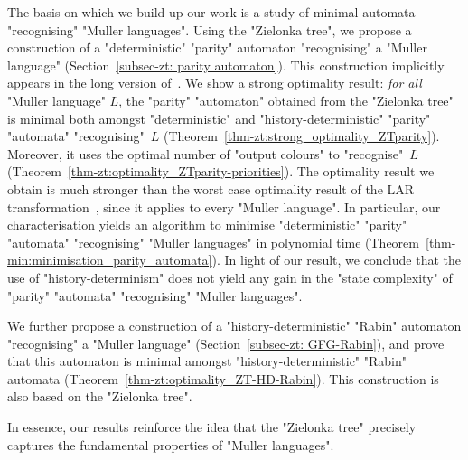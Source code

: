 \documentclass[10pt,a4paper]{amsart}
\newenvironment{longdescription} %
{\begin{description}[style=unboxed]}
	{\end{description}}
\begin{document}
\begin{longdescription}
	\item[1. Minimal automata for Muller languages.] The basis on which we build up our work is a study of minimal automata "recognising" "Muller languages". Using the "Zielonka tree", we propose a construction of a "deterministic" "parity" automaton "recognising" a "Muller language" (Section~\ref{subsec-zt: parity automaton}). This construction implicitly appears in the long version of~\cite{DJW1997memory}. We show a strong optimality result: \emph{for all} "Muller language" $L$, the "parity" "automaton" obtained from the "Zielonka tree" is minimal both amongst "deterministic" and "history-deterministic" "parity" "automata" "recognising"~$L$ (Theorem~\ref{thm-zt:strong_optimality_ZTparity}).\footnotemark{} Moreover, it uses the optimal number of "output colours" to "recognise"~$L$ (Theorem~\ref{thm-zt:optimality_ZTparity-priorities}).  The optimality result we obtain is much stronger than the worst case optimality result of the LAR transformation~\cite{Loding1999Optimal}, since it applies to every "Muller language". In particular, our characterisation yields an algorithm to minimise "deterministic" "parity" "automata" "recognising" "Muller languages" in polynomial time (Theorem~\ref{thm-min:minimisation_parity_automata}).
	In light of our result, we conclude that the use of "history-determinism" does not yield any gain in the "state complexity" of "parity" "automata" "recognising" "Muller languages". 
	
	
	We further propose a construction of a "history-deterministic" "Rabin" automaton "recognising" a "Muller language" (Section~\ref{subsec-zt: GFG-Rabin}), and prove that this automaton is minimal amongst "history-deterministic" "Rabin" automata (Theorem~\ref{thm-zt:optimality_ZT-HD-Rabin}). This construction is also based on the "Zielonka tree". %
	
	In essence, our results reinforce the idea that the "Zielonka tree" precisely captures the fundamental properties of  "Muller languages".
	

\end{longdescription}
\end{document}
